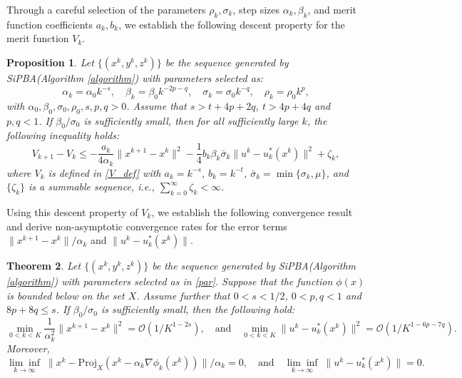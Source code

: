 \documentclass{article}
\newtheorem{theorem}{Theorem}[section]
\newtheorem{proposition}[theorem]{Proposition}
\begin{document}
Through a careful selection of the parameters $\rho_k, \sigma_k$, step sizes $\alpha_k, \beta_k$, and merit function coefficients $a_k, b_k$, we establish the following descent property for the merit function $V_k$.

\begin{proposition}\label{prop4.1}
    Let $\{(x^k, y^k, z^k)\}$ be the sequence generated by SiPBA(Algorithm \ref{algorithm}) with parameters selected as:
    \begin{equation}\label{par}
      \alpha_k = \alpha_0 k^{-s}, \quad \beta_k = \beta_0 k^{-2p-q}, \quad  \sigma_k = \sigma_0 k^{-q}, \quad \rho_k = \rho_0 k^p,
    \end{equation}
    with $\alpha_0, \beta_0, \sigma_0, \rho_0, s, p, q >0$. Assume that $s > t + 4p+2q$, $t > 4p + 4q$ and $p,q < 1$. If $\beta_0/\sigma_0$ is sufficiently small, then for all sufficiently large $k$, the following inequality holds:
    \begin{equation}\label{prop4.1_eq}
         V_{k+1} - V_k \le -  \frac{a_k}{4\alpha_k} \|x^{k+1}-x^{k}\|^2 -\frac{1}{4}b_k \beta_k\bar{\sigma}_k \|u^{k}-u_{k}^*(x^{k})\|^2  + \zeta_k,
    \end{equation}
where $V_k$ is defined in \eqref{V_def} with $a_k = k^{-s}$, $b_k = k^{-t}$,  $\bar{\sigma}_k = \min\{\sigma_k, \mu\}$, and $\{\zeta_k\}$ is a summable sequence, i.e., $\sum_{k=0}^{\infty} \zeta_k < \infty$. 
\end{proposition}

Using this descent property of $V_k$, we establish the following convergence result and derive non-asymptotic convergence rates for the error terms $\| x^{k+1}-x^{k}\|/\alpha_k$ and $\|u^{k}-u_{k}^*(x^{k})\|$.

 \begin{theorem}\label{thm1}
         Let $\{(x^k, y^k, z^k)\}$ be the sequence generated by SiPBA(Algorithm \ref{algorithm}) with parameters selected as in \eqref{par}.
Suppose that the function $\phi(x)$ is bounded below on the set $X$. Assume  further that  $ 0 < s < 1/2$, $0 < p,q < 1$ and $8p + 8q \le s$. If $ \beta_0/\sigma_0$ is sufficiently small, then the following hold:
    \[
    \min_{0<k<K} \frac{1}{\alpha_k^2} \| x^{k+1}-x^{k}\|^2 = \mathcal{O}(1/K^{1-2s}), 
\quad \text{and} \quad
    \min_{0<k<K}  \|u^{k}-u_{k}^*(x^{k})\|^2 = \mathcal{O}(1/K^{1-6p-7q}).
    \]
    Moreover,
    \[
    \underset{k \rightarrow \infty}{\lim\inf}\;\|x^{k} - \mathrm{Proj}_X\left(x^k - \alpha_k \nabla \phi_k(x^k) \right) \|/\alpha_k = 0, \quad \text{and} \quad
\underset{k \rightarrow \infty}{\lim\inf}\;\| u^{k}-u_{k}^*(x^{k}) \| = 0.
    \]
     \end{theorem}
\end{document}
